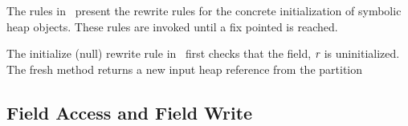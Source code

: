 \documentclass[11pt]{amsart}
\begin{document}
The rules in~ present the rewrite rules for the
concrete initialization of symbolic heap objects.  These rules are
invoked until a fix pointed is reached. 

The initialize (null) rewrite rule in~ first
checks that the field, $\emph{r}$ is uninitialized. The fresh method
returns a new input heap reference from the partition 

\subsection{Field Access and Field Write}




\end{document}

